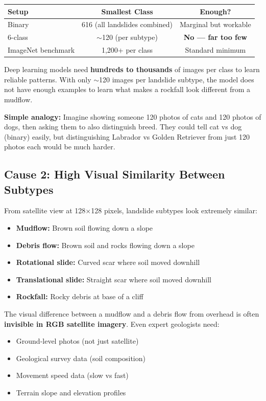 \documentclass[12pt,a4paper]{article}
\begin{document}
\begin{table}[h]
    \centering
    \begin{tabular}{lcc}
        \toprule
        \textbf{Setup} & \textbf{Smallest Class} & \textbf{Enough?} \\
        \midrule
        Binary   & 616 (all landslides combined) & Marginal but workable \\
        6-class  & $\sim$120 (per subtype) & \textcolor{badred}{\textbf{No --- far too few}} \\
        \midrule
        ImageNet benchmark & 1,200+ per class & Standard minimum \\
        \bottomrule
    \end{tabular}
\end{table}

Deep learning models need \textbf{hundreds to thousands} of images per class to learn reliable patterns. With only $\sim$120 images per landslide subtype, the model does not have enough examples to learn what makes a rockfall look different from a mudflow.

\textbf{Simple analogy:} Imagine showing someone 120 photos of cats and 120 photos of dogs, then asking them to also distinguish breed. They could tell cat vs dog (binary) easily, but distinguishing Labrador vs Golden Retriever from just 120 photos each would be much harder.

\subsection{Cause 2: High Visual Similarity Between Subtypes}

From satellite view at 128$\times$128 pixels, landslide subtypes look extremely similar:

\begin{itemize}
    \item \textbf{Mudflow:} Brown soil flowing down a slope
    \item \textbf{Debris flow:} Brown soil and rocks flowing down a slope
    \item \textbf{Rotational slide:} Curved scar where soil moved downhill
    \item \textbf{Translational slide:} Straight scar where soil moved downhill
    \item \textbf{Rockfall:} Rocky debris at base of a cliff
\end{itemize}

The visual difference between a mudflow and a debris flow from overhead is often \textbf{invisible in RGB satellite imagery}. Even expert geologists need:
\begin{itemize}
    \item Ground-level photos (not just satellite)
    \item Geological survey data (soil composition)
    \item Movement speed data (slow vs fast)
    \item Terrain slope and elevation profiles
\end{itemize}
\end{document}
